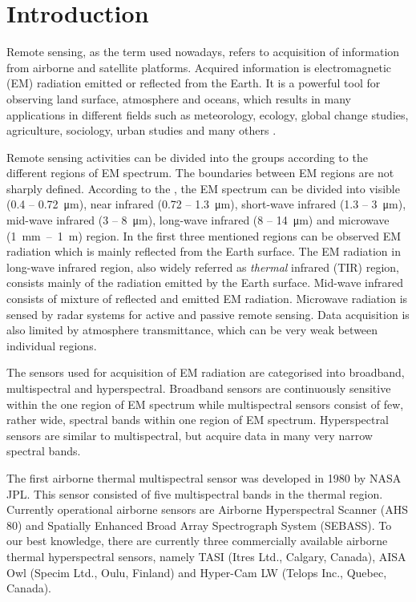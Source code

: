 \chapter*{Introduction}

Remote sensing, as the term used nowadays, refers to acquisition of information from airborne and satellite platforms. Acquired information is electromagnetic (EM) radiation emitted or reflected from the Earth. It is a powerful tool for observing land surface, atmosphere and oceans, which results in many applications in different fields such as meteorology, ecology, global change studies, agriculture, sociology, urban studies and many others \cite{VD01}.

Remote sensing activities can be divided into the groups according to the different regions of EM spectrum. The boundaries between EM regions are not sharply defined. According to the \cite{Z14}, the EM spectrum can be divided into visible (0.4 – \SI{0.72}{\micro\meter}), near infrared (0.72 – \SI{1.3}{\micro\meter}), short-wave infrared (1.3 – \SI{3}{\micro\meter}), mid-wave infrared (3 – \SI{8}{\micro\meter}), long-wave infrared (8 – \SI{14}{\micro\meter}) and microwave (\SI{1}{\milli\meter}~–~\SI{1}{\meter}) region. In the first three mentioned regions can be observed EM radiation which is mainly reflected from the Earth surface. The EM radiation in long-wave infrared region, also widely referred as \textit{thermal} infrared (TIR) region, consists mainly of the radiation emitted by the Earth surface. Mid-wave infrared consists of mixture of reflected and emitted EM radiation. Microwave radiation is sensed by radar systems for active and passive remote sensing. Data acquisition is also limited by atmosphere transmittance, which can be very weak between individual regions.

The sensors used for acquisition of EM radiation are categorised into broadband, multispectral and hyperspectral. Broadband sensors are continuously sensitive within the one region of EM spectrum while multispectral sensors consist of few, rather wide, spectral bands within one region of EM spectrum. Hyperspectral sensors are similar to multispectral, but acquire data in many very narrow spectral bands. 

The first airborne thermal multispectral sensor was developed in 1980 by NASA JPL. This sensor consisted of five multispectral bands in the thermal region. Currently operational airborne sensors are Airborne Hyperspectral Scanner (AHS 80) and Spatially Enhanced Broad Array Spectrograph System (SEBASS). To our best knowledge, there are currently three commercially available airborne thermal hyperspectral sensors, namely TASI (Itres Ltd., Calgary, Canada), AISA Owl (Specim Ltd., Oulu, Finland) and Hyper-Cam LW (Telops Inc., Quebec, Canada).

